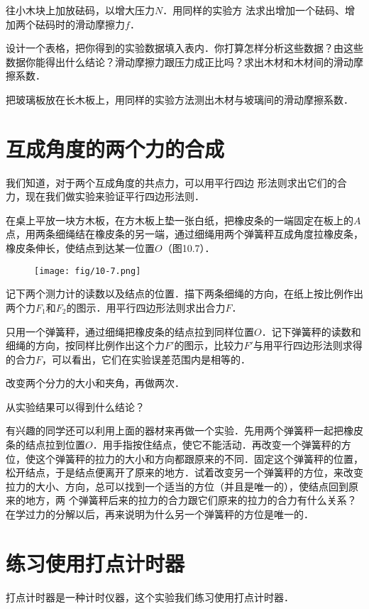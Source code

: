 往小木块上加放砝码，以增大压力$N$．用同样的实验方
法求出增加一个砝码、增加两个砝码时的滑动摩擦力$f$．

设计一个表格，把你得到的实验数据填入表内．你打算怎样分析这些数据？由这些数据你能得出什么结论？滑动摩擦力跟压力成正比吗？求出木材和木材间的滑动摩擦系数．

把玻璃板放在长木板上，用同样的实验方法测出木材与坡璃间的滑动摩擦系数．

\section{互成角度的两个力的合成}

我们知道，对于两个互成角度的共点力，可以用平行四边
形法则求出它们的合力，现在我们做实验来验证平行四边形法则．
	
在桌上平放一块方木板，在方木板上垫一张白纸，把橡皮条的一端固定在板上的$A$点，用两条细绳结在橡皮条的另一端，通过细绳用两个弹簧秤互成角度拉橡皮条，橡皮条伸长，使结点到达某一位置$O$（图10.7）．
\begin{figure}[htp]\centering
\texttt{[image: fig/10-7.png]}
\caption{}
\end{figure}

记下两个测力计的读数以及结点的位置．描下两条细绳的方向，在纸上按比例作出两个力$F_1$和$F_2$的图示．用平行四边形法则求出合力$F$．

只用一个弹簧秤，通过细绳把橡皮条的结点拉到同样位置$O$．记下弹簧秤的读数和细绳的方向，按同样比例作出这个力$F'$的图示，比较力$F'$与用平行四边形法则求得的合力$F$，可以看出，它们在实验误差范围内是相等的．

改变两个分力的大小和夹角，再做两次．

从实验结果可以得到什么结论？

有兴趣的同学还可以利用上面的器材来再做一个实验．先用两个弹簧秤一起把橡皮条的结点拉到位置$O$．用手指按住结点，使它不能活动．再改变一个弹簧秤的方位，使这个弹簧秤的拉力的大小和方向都跟原来的不同．固定这个弹簧秤的位置，松开结点，于是结点便离开了原来的地方．试着改变另一个弹簧秤的方位，来改变拉力的大小、方向，总可以找到一个适当的方位（并且是唯一的），使结点回到原来的地方，两
个弹簧秤后来的拉力的合力跟它们原来的拉力的合力有什么关系？在学过力的分解以后，再来说明为什么另一个弹簧秤的方位是唯一的．	
	
\section{练习使用打点计时器}
打点计时器是一种计时仪器，这个实验我们练习使用打点计时器．

